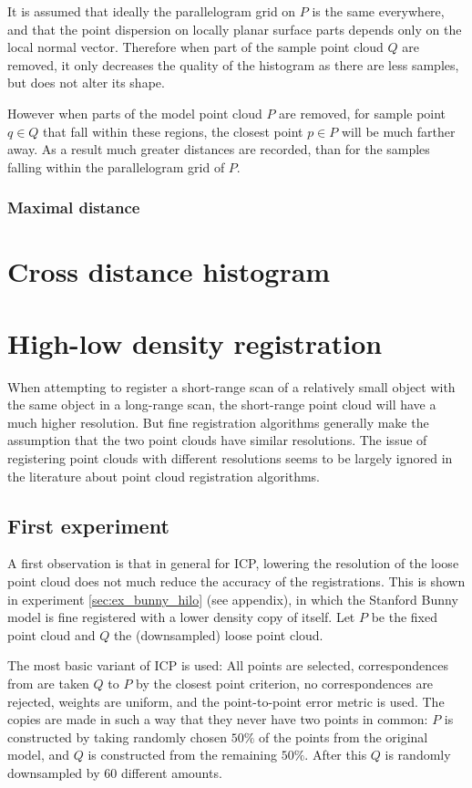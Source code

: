 It is assumed that ideally the parallelogram grid on $P$ is the same everywhere, and that the point dispersion on locally planar surface parts depends only on the local normal vector. Therefore when part of the sample point cloud $Q$ are removed, it only decreases the quality of the histogram as there are less samples, but does not alter its shape.

However when parts of the model point cloud $P$ are removed, for sample point $q \in Q$ that fall within these regions, the closest point $p \in P$ will be much farther away. As a result much greater distances are recorded, than for the samples falling within the parallelogram grid of $P$.



\subsubsection{Maximal distance}



\section{Cross distance histogram}


\section{High-low density registration}
When attempting to register a short-range scan of a relatively small object with the same object in a long-range scan, the short-range point cloud will have a much higher resolution. But fine registration algorithms generally make the assumption that the two point clouds have similar resolutions. The issue of registering point clouds with different resolutions seems to be largely ignored in the literature about point cloud registration algorithms.

\subsection{First experiment}
A first observation is that in general for ICP, lowering the resolution of the loose point cloud does not much reduce the accuracy of the registrations. This is shown in experiment \ref{sec:ex_bunny_hilo} (see appendix), in which the Stanford Bunny model is fine registered with a lower density copy of itself. Let $P$ be the fixed point cloud and $Q$ the (downsampled) loose point cloud.

The most basic variant of ICP is used: All points are selected, correspondences from are taken $Q$ to $P$ by the closest point criterion, no correspondences are rejected, weights are uniform, and the point-to-point error metric is used. The copies are made in such a way that they never have two points in common: $P$ is constructed by taking randomly chosen $50\%$ of the points from the original model, and $Q$ is constructed from the remaining $50\%$. After this $Q$ is randomly downsampled by $60$ different amounts.

